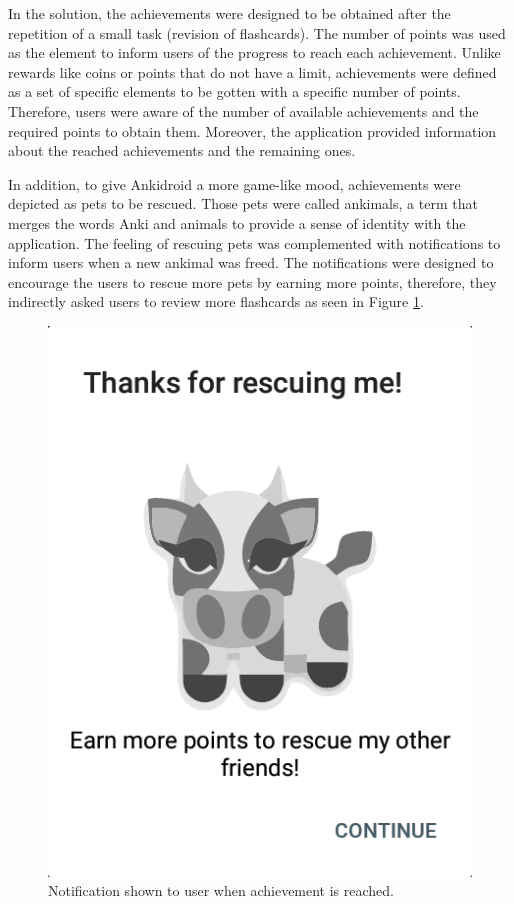 In the solution, the achievements were designed to be obtained after the repetition of a small task (revision of flashcards). The number of points was used as the element to inform users of the progress to reach each achievement. Unlike rewards like coins or points that do not have a limit, achievements were defined as a set of specific elements to be gotten with a specific number of points. Therefore, users were aware of the number of available achievements and the required points to obtain them. Moreover, the application provided information about the reached achievements and the remaining ones.

In addition, to give Ankidroid a more game-like mood, achievements were depicted as pets to be rescued. Those pets were called ankimals, a term that merges the words Anki and animals to provide a sense of identity with the application. The feeling of rescuing pets was complemented with notifications to inform users when a new ankimal was freed. The notifications were designed to encourage the users to rescue more pets by earning more points, therefore, they indirectly asked users to review more flashcards as seen in Figure \ref{fig:ankimals-rescue}.

\begin{figure}[htb]
    \vskip 5mm
        \begin{center}
            \includegraphics[scale=0.5]{./Figures/achievement_notification.png}
            \caption{Notification shown to user when achievement is reached.}
            \label{fig:ankimals-rescue}
        \end{center}
    \vskip -5mm
\end{figure}

